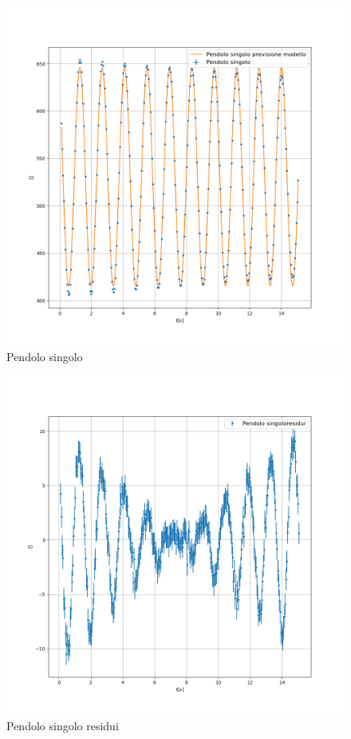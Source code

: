 \documentclass{article}
\begin{document}
                 \begin{figure}[h! ]
                    \centering
                    \includegraphics[width=1\linewidth]{Pendolo singolo.png}
                    \caption{Pendolo singolo}
                    \label{fig:ps}
                \end{figure}
    
                \begin{figure}[h! ]
                    \centering
                    \includegraphics[width=1\linewidth]{Pendolo singolo_residuals.png}
                    \caption{Pendolo singolo residui}
                    \label{fig:psres}
                \end{figure}
\end{document}
